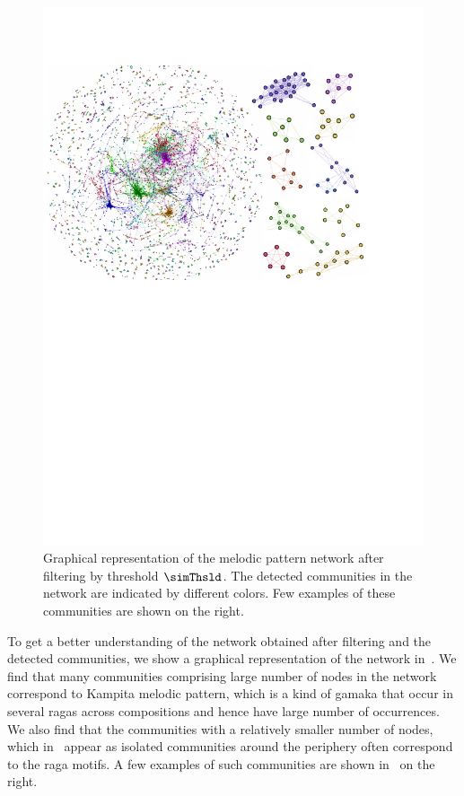 {\begin{figure}
	\begin{center}
		\includegraphics[width=\figSizeHundred]{ch06_patterns/figures/Characterization/networkWithClusters.pdf}
	\end{center}
 \caption{Graphical representation of the melodic pattern network after filtering by threshold $\simThsld$. The detected communities in the network are indicated by different colors. Few examples of these communities are shown on the right.}
 \label{fig:network_and_communities_pattern_characterization}
\end{figure}

To get a better understanding of the network obtained after filtering and the detected communities, we show a graphical representation of the network in~. We find that many communities comprising large number of nodes in the network correspond to Kampita melodic pattern, which is a kind of \gls{gamaka} that occur in several \glspl{raga} across compositions and hence have large number of occurrences. We also find that the communities with a relatively smaller number of nodes, which in~ appear as isolated communities around the periphery often correspond to the \gls{raga} motifs. A few examples of such communities are shown in~ on the right.

}

